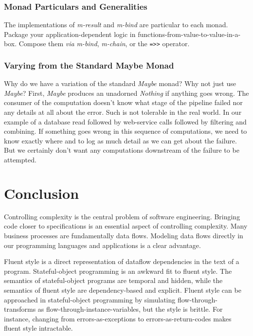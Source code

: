 \documentclass[11pt]{article}
\begin{document}
\subsubsection{Monad Particulars and Generalities}
\label{sec-3-2-2}

The implementations of \emph{m-result} and \emph{m-bind} are particular to
each monad. Package your application-dependent logic in
functions-from-value-to-value-in-a-box. Compose them \emph{via}
\emph{m-bind}, \emph{m-chain}, or the \verb|=>>| operator.
\subsubsection{Varying from the Standard Maybe Monad}
\label{sec-3-2-3}

Why do we have a variation of the standard \emph{Maybe} monad? Why not
just use \emph{Maybe}? First, \emph{Maybe} produces an unadorned \emph{Nothing} if
anything goes wrong. The consumer of the computation doesn't know
what stage of the pipeline failed nor any details at all about the
error. Such is not tolerable in the real world. In our example of a
database read followed by web-service calls followed by filtering
and combining. If something goes wrong in this sequence of
computations, we need to know exactly where and to log as much
detail as we can get about the failure. But we certainly don't want
any computations downstream of the failure to be attempted.
\section{Conclusion}
\label{sec-4}

Controlling complexity is the central problem of software
engineering. Bringing code closer to specifications is an essential
aspect of controlling complexity. Many business processes are
fundamentally data flows. Modeling data flows directly in our
programming languages and applications is a clear advantage.

Fluent style is a direct representation of dataflow dependencies in
the text of a program. Stateful-object programming is an awkward fit
to fluent style. The semantics of stateful-object programs are
temporal and hidden, while the semantics of fluent style are
dependency-based and explicit. Fluent style can be approached in
stateful-object programming by simulating flow-through-transforms as
flow-through-instance-variables, but the style is brittle. For
instance, changing from errors-as-exceptions to
errors-as-return-codes makes fluent style intractable.
\end{document}

